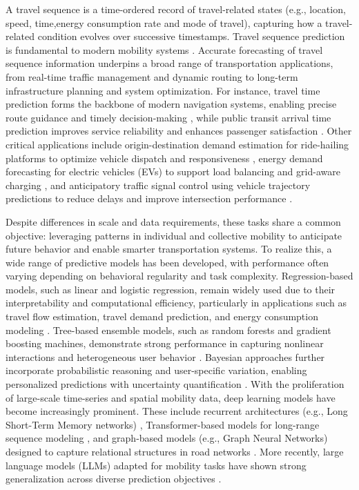 \documentclass[12pt,review,authoryear]{elsarticle}
\theoremstyle{upright}
\begin{document}
\label{introduction}
A travel sequence is a time-ordered record of travel-related states (e.g., location, speed, time,energy consumption rate and mode of travel), capturing how a travel-related condition evolves over successive timestamps. Travel sequence prediction is fundamental to modern mobility systems \citep{chow2018informed}. Accurate forecasting of travel sequence information underpins a broad range of transportation applications, from real-time traffic management and dynamic routing to long-term infrastructure planning and system optimization. For instance, travel time prediction forms the backbone of modern navigation systems, enabling precise route guidance and timely decision-making \citep{chiabaut2021traffic, derrow2021eta}, while public transit arrival time prediction improves service reliability and enhances passenger satisfaction \citep{singh2022review, ricard2022predicting}. Other critical applications include origin-destination demand estimation for ride-hailing platforms to optimize vehicle dispatch and responsiveness \citep{liu2022machine, lin2023deep}, energy demand forecasting for electric vehicles (EVs) to support load balancing and grid-aware charging \citep{ullah2021electric, palaniyappan2024dynamic}, and anticipatory traffic signal control using vehicle trajectory predictions to reduce delays and improve intersection performance \citep{wang2022trajectory, zhu2024multi}.

Despite differences in scale and data requirements, these tasks share a common objective: leveraging patterns in individual and collective mobility to anticipate future behavior and enable smarter transportation systems. To realize this, a wide range of predictive models has been developed, with performance often varying depending on behavioral regularity and task complexity. Regression-based models, such as linear and logistic regression, remain widely used due to their interpretability and computational efficiency, particularly in applications such as travel flow estimation, travel demand prediction, and energy consumption modeling \citep{rajeh2023modeling, kim2020stepwise, de2015energy}. Tree-based ensemble models, such as random forests and gradient boosting machines, demonstrate strong performance in capturing nonlinear interactions and heterogeneous user behavior \citep{chung2019ensemble, shahriar2021prediction}. Bayesian approaches further incorporate probabilistic reasoning and user-specific variation, enabling personalized predictions with uncertainty quantification \citep{chen2023probabilistic, sengupta2024bayesian}. With the proliferation of large-scale time-series and spatial mobility data, deep learning models have become increasingly prominent. These include recurrent architectures (e.g., Long Short-Term Memory networks) \citep{hochreiter1997long, fu2016using}, Transformer-based models for long-range sequence modeling \citep{vaswani2017attention, reza2022multi}, and graph-based models (e.g., Graph Neural Networks) designed to capture relational structures in road networks \citep{li2017diffusion, zhao2019t}. More recently, large language models (LLMs) adapted for mobility tasks have shown strong generalization across diverse prediction objectives \citep{mo2023large,wang2023would}.
\end{document}

